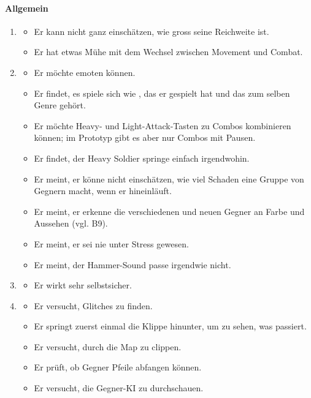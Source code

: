 \documentclass[../Main.tex]{subfiles}
\begin{document}
\paragraph{Allgemein}
\begin{enumerate}[label=\textbf{B\arabic*}, leftmargin=1.5cm, itemsep=0.8em, resume]
\item
\begin{itemize}[nosep]
\item Er kann nicht ganz einschätzen, wie gross seine Reichweite ist.
\item Er hat etwas Mühe mit dem Wechsel zwischen Movement und Combat.
\end{itemize}
\item
\begin{itemize}[nosep]
\item Er möchte emoten können.
\item Er findet, es spiele sich wie , das er gespielt hat und das zum selben Genre gehört.
\item Er möchte Heavy- und Light-Attack-Tasten zu Combos kombinieren können; im Prototyp gibt es aber nur Combos mit Pausen.
\item Er findet, der Heavy Soldier springe einfach irgendwohin.
\item Er meint, er könne nicht einschätzen, wie viel Schaden eine Gruppe von Gegnern macht, wenn er hineinläuft.
\item Er meint, er erkenne die verschiedenen und neuen Gegner an Farbe und Aussehen (vgl. B9).
\item Er meint, er sei nie unter Stress gewesen.
\item Er meint, der Hammer-Sound passe irgendwie nicht.
\end{itemize}
\item
\begin{itemize}[nosep]
\item Er wirkt sehr selbstsicher.
\end{itemize}
\item
\begin{itemize}[nosep]
\item Er versucht, Glitches zu finden.
\item Er springt zuerst einmal die Klippe hinunter, um zu sehen, was passiert.
\item Er versucht, durch die Map zu clippen.
\item Er prüft, ob Gegner Pfeile abfangen können.
\item Er versucht, die Gegner-KI zu durchschauen.

\end{itemize}
\end{enumerate}
\end{document}

